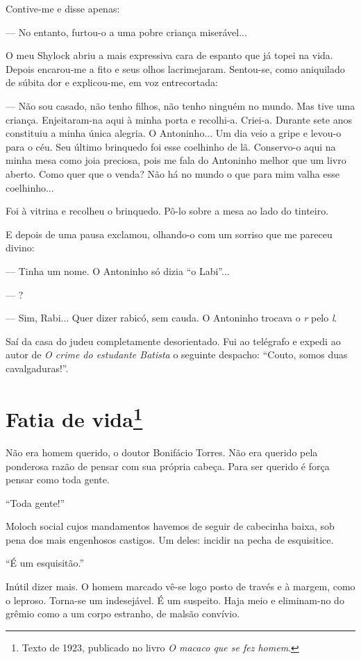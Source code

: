 Contive-me e disse apenas:

--- No entanto, furtou-o a uma pobre criança miserável...

O meu Shylock abriu a mais expressiva cara de espanto que já topei na
vida. Depois encarou-me a fito e seus olhos lacrimejaram. Sentou-se,
como aniquilado de súbita dor e explicou-me, em voz entrecortada:

--- Não sou casado, não tenho filhos, não tenho ninguém no mundo. Mas
tive uma criança. Enjeitaram-na aqui à minha porta e recolhi-a. Criei-a.
Durante sete anos constituiu a minha única alegria. O Antoninho... Um
dia veio a gripe e levou-o para o céu. Seu último brinquedo foi esse
coelhinho de lã. Conservo-o aqui na minha mesa como joia preciosa, pois
me fala do Antoninho melhor que um livro aberto. Como quer que o venda?
Não há no mundo o que para mim valha esse coelhinho...

Foi à vitrina e recolheu o brinquedo. Pô-lo sobre a mesa ao lado do
tinteiro.

E depois de uma pausa exclamou, olhando-o com um sorriso que me pareceu
divino:

--- Tinha um nome. O Antoninho só dizia ``o Labi''...

--- ?

--- Sim, Rabi... Quer dizer rabicó, sem cauda. O Antoninho trocava o
\emph{r} pelo \emph{l}.

Saí da casa do judeu completamente desorientado. Fui ao telégrafo e
expedi ao autor de \emph{O crime do estudante Batista} o seguinte
despacho: ``Couto, somos duas cavalgaduras!''.

\chapter{Fatia de vida\footnote[*]{Texto de 1923, publicado no livro \emph{O macaco que se fez homem}.}}


Não era homem querido, o doutor Bonifácio Torres. Não era querido pela
ponderosa razão de pensar com sua própria cabeça. Para ser querido é
força pensar como toda gente.

``Toda gente!''

Moloch social cujos mandamentos havemos de seguir de cabecinha baixa,
sob pena dos mais engenhosos castigos. Um deles: incidir na pecha de
esquisitice.

``É um esquisitão.''

Inútil dizer mais. O homem marcado vê-se logo posto de través e à
margem, como o leproso. Torna-se um indesejável. É um suspeito. Haja
meio e eliminam-no do grêmio como a um corpo estranho, de malsão
convívio.

